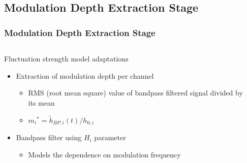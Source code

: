 \documentclass{beamer}
\begin{document}
\subsection{Modulation Depth Extraction Stage}
\begin{frame}
  \frametitle{Modulation Depth Extraction Stage}
  \begin{columns}
    \begin{column}{0.5\textwidth}
      Fluctuation strength model adaptations
      \begin{itemize}
        \item<1-> Extraction of modulation depth per channel
        \begin{itemize}
          \item<2-> RMS (root mean square) value of bandpass filtered signal
            divided by its mean
          \item<3-> ${m_i}^* = \tilde{h}_{BP,i}(t)/h_{0,i}$
        \end{itemize}
        \item<4-> Bandpass filter using $H_i$ parameter
        \begin{itemize}
          \item<5-> Models the dependence on modulation frequency
        \end{itemize}
      \end{itemize}
    \end{column}
    \begin{column}{0.5\textwidth}
\end{column}
\end{columns}
\end{frame}
\end{document}
